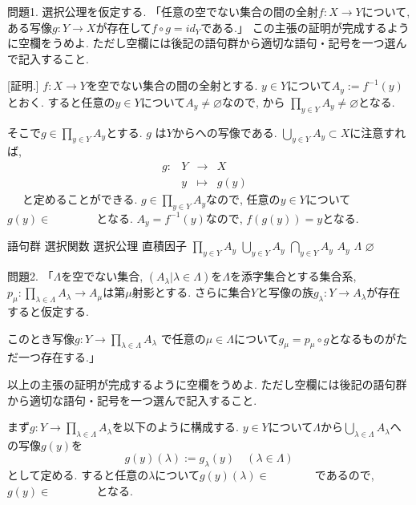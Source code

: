 \documentclass[dvipdfmx,a4paper,11pt]{article}
\theoremstyle{definition}
\begin{document}
 問題1.  選択公理を仮定する.
  「任意の空でない集合の間の全射$f :X \to Y$について, ある写像$g : Y \to X$が存在して$f \circ g = id_Y$である.」
  この主張の証明が完成するように空欄をうめよ. ただし空欄には後記の語句群から適切な語句・記号を一つ選んで記入すること.
 
 [証明.]
$f :X \to Y$を空でない集合の間の全射とする. 
 $y \in Y$について$A_{y}:=f^{-1}(y)$とおく. 
 すると任意の$y\in Y$について$A_{y} \neq \varnothing$なので, \boxed{\phantom{hogehoge}}から
$\prod_{y \in Y} A_{y} \neq \varnothing$となる.

そこで$g \in \prod_{y \in Y} A_{y}$とする. 
$g$ は$Y$から\boxed{\phantom{hogehoge}}への写像である. 
$\bigcup_{y \in Y}A_{y} \subset X$に注意すれば, 
$$
\begin{array}{ccccc}
g : &Y& \rightarrow &X& \\
&y& \longmapsto & 
g(y)
 &
\end{array}
$$　
と定めることができる. 
$g \in \prod_{y \in Y} A_{y}$なので, 任意の$y \in Y$について
$g(y) \in \boxed{\phantom{hogehoge}}$となる.
$A_y =f^{-1}(y)$なので, $f(g(y))=y$となる. 

 \begin{itembox}[l]{語句群}
選択関数 \quad 選択公理 \quad 直積因子
\quad $\prod_{y \in Y} A_{y}$
\quad $\bigcup_{y \in Y}A_{y}$
\quad $\bigcap_{y \in Y}A_{y}$
\quad $A_y$
\quad $\Lambda$
\quad $\varnothing$
\end{itembox}


\newpage

問題2. 「$\Lambda$を空でない集合, $(A_{\lambda} | \lambda \in \Lambda)$を$\Lambda$を添字集合とする集合系, 
$p_{\mu}: \prod_{\lambda \in \Lambda} A_{\lambda} \to A_{\mu}$は第$\mu$射影とする. 
さらに集合$Y$と写像の族$g_{\lambda} : Y \rightarrow A_\lambda $が存在すると仮定する. 

このとき写像$g : Y \rightarrow \prod_{\lambda \in \Lambda} A_{\lambda}$
で任意の$\mu \in \Lambda$について$g_{\mu} = p_{\mu} \circ g $となるものがただ一つ存在する.」

以上の主張の証明が完成するように空欄をうめよ. ただし空欄には後記の語句群から適切な語句・記号を一つ選んで記入すること.

\medskip
[証明.]
まず$g : Y \rightarrow \prod_{\lambda \in \Lambda} A_{\lambda}$を以下のように構成する.
$y \in Y$について$\Lambda$から$\bigcup_{\lambda \in \Lambda}A_{\lambda} $への写像$g(y)$を
$$
g(y)(\lambda):=g_{\lambda}(y)
\quad
(\text{$\lambda \in \Lambda$})
$$
として定める. 
すると任意の$\lambda$について$g(y)(\lambda) \in \boxed{\phantom{hogehoge}}$であるので, 
$g(y) \in\boxed{\phantom{hogehoge}}$となる.
\end{document}
